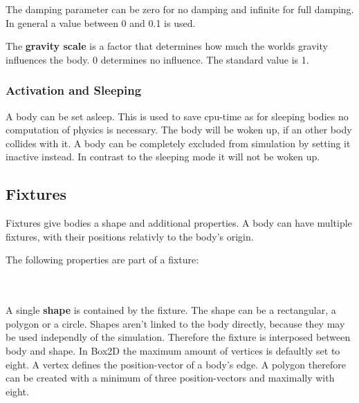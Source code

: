 \documentclass[10pt,a4paper,DIV=11]{scrreprt}
\begin{document}
The damping parameter can be zero for no damping and infinite for full damping. In general a value between 0 and 0.1 is used.

The \textbf{gravity scale} is a factor that determines how much the worlds gravity influences the body. 0 determines no influence. The standard value is 1.

\subsubsection*{Activation and Sleeping}
A body can be set asleep. This is used to save cpu-time as for sleeping bodies no computation of physics is necessary. The body will be woken up, if an other body collides with it.
A body can be completely excluded from simulation by setting it inactive instead.
In contrast to the sleeping mode it will not be woken up.

\subsection{Fixtures}
Fixtures give bodies a shape and additional properties. A body can have multiple fixtures, with their positions relativly to the body's origin.

The following properties are part of a fixture:


   \\
\\

A single \textbf{shape} is contained by the fixture. The shape can be a rectangular, a polygon or a circle. Shapes aren't linked to the body directly, because they may be used independly of the simulation. Therefore the fixture is interposed between body and shape. In Box2D the maximum amount of vertices is defaultly set to eight. A vertex defines the position-vector of a body's edge. A polygon therefore can be created with a minimum of three position-vectors and maximally with eight.
\\
\end{document}
